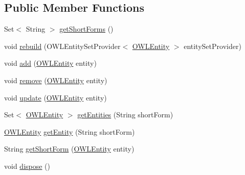 \subsection*{Public Member Functions}
\begin{DoxyCompactItemize}
\item 
Set$<$ String $>$ \hyperlink{classorg_1_1semanticweb_1_1owlapi_1_1util_1_1_caching_bidirectional_short_form_provider_aa97d678721a067c0eb194bb824cc4ea3}{get\-Short\-Forms} ()
\item 
void \hyperlink{classorg_1_1semanticweb_1_1owlapi_1_1util_1_1_caching_bidirectional_short_form_provider_a45a7a87dd01fd7868cde4e9f3c1eda99}{rebuild} (O\-W\-L\-Entity\-Set\-Provider$<$ \hyperlink{interfaceorg_1_1semanticweb_1_1owlapi_1_1model_1_1_o_w_l_entity}{O\-W\-L\-Entity} $>$ entity\-Set\-Provider)
\item 
void \hyperlink{classorg_1_1semanticweb_1_1owlapi_1_1util_1_1_caching_bidirectional_short_form_provider_a983ed006ad38cd548c9eb4f2bedeeb69}{add} (\hyperlink{interfaceorg_1_1semanticweb_1_1owlapi_1_1model_1_1_o_w_l_entity}{O\-W\-L\-Entity} entity)
\item 
void \hyperlink{classorg_1_1semanticweb_1_1owlapi_1_1util_1_1_caching_bidirectional_short_form_provider_a09db63908a933d2e4fb34f7f21239a19}{remove} (\hyperlink{interfaceorg_1_1semanticweb_1_1owlapi_1_1model_1_1_o_w_l_entity}{O\-W\-L\-Entity} entity)
\item 
void \hyperlink{classorg_1_1semanticweb_1_1owlapi_1_1util_1_1_caching_bidirectional_short_form_provider_acfdd92494a929c9f6e01a7f1e033cc66}{update} (\hyperlink{interfaceorg_1_1semanticweb_1_1owlapi_1_1model_1_1_o_w_l_entity}{O\-W\-L\-Entity} entity)
\item 
Set$<$ \hyperlink{interfaceorg_1_1semanticweb_1_1owlapi_1_1model_1_1_o_w_l_entity}{O\-W\-L\-Entity} $>$ \hyperlink{classorg_1_1semanticweb_1_1owlapi_1_1util_1_1_caching_bidirectional_short_form_provider_a52d60cb706e3e38c74591bbedc5e3e21}{get\-Entities} (String short\-Form)
\item 
\hyperlink{interfaceorg_1_1semanticweb_1_1owlapi_1_1model_1_1_o_w_l_entity}{O\-W\-L\-Entity} \hyperlink{classorg_1_1semanticweb_1_1owlapi_1_1util_1_1_caching_bidirectional_short_form_provider_a823ade303b20a739ce3df4bf3226d7b0}{get\-Entity} (String short\-Form)
\item 
String \hyperlink{classorg_1_1semanticweb_1_1owlapi_1_1util_1_1_caching_bidirectional_short_form_provider_abab7f3c27c955a3a4f5f9dae8c7f0a9f}{get\-Short\-Form} (\hyperlink{interfaceorg_1_1semanticweb_1_1owlapi_1_1model_1_1_o_w_l_entity}{O\-W\-L\-Entity} entity)
\item 
void \hyperlink{classorg_1_1semanticweb_1_1owlapi_1_1util_1_1_caching_bidirectional_short_form_provider_aca1840681ddd0033a2e617b818b12607}{dispose} ()
\end{DoxyCompactItemize}
